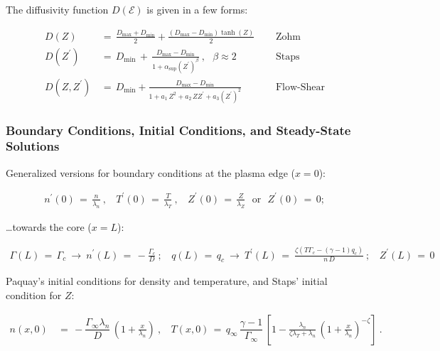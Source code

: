 \documentclass[a4paper,8pt]{article}
\begin{document}
\normalsize

The diffusivity function \(D(\mathcal{E})\) is given in a few forms:
\small

\begin{align}
    D(Z) \,&=\, \frac{D_\text{max} + D_\text{min}}{2} +
        \frac{(D_\text{max} - D_\text{min})\tanh(Z)}{2} ~~~~~~ &\text{Zohm} \\
    D(Z^\prime) \,&=\, D_\text{min} \,+\, \frac{D_\text{max} - D_\text{min}}
        {1 + \alpha_\text{sup}(Z^\prime)^\beta}~,~~~ \beta \approx 2 ~~~~~~
        &\text{Staps} \\
    D(Z, Z^\prime) \,&=\, D_\text{min} + \frac{D_\text{max} - D_\text{min}}
        {1 + a_1\,Z^2 + a_2\,Z Z^\prime + a_3\left(Z^\prime\right)^2} ~~~~~~
        &\text{Flow-Shear}
\end{align}

\normalsize

\subsubsection{Boundary Conditions, Initial Conditions, and Steady-State
Solutions}\label{boundary-conditions-initial-conditions-and-steady-state-solutions}

Generalized versions for boundary conditions at the plasma edge
(\(x=0\)): \small

\begin{align}
    n^\prime(0) \,=\, \frac{n}{\lambda_n}~,~~~~ T^\prime(0) \,=\,
        \frac{T}{\lambda_T}~,~~~~ Z^\prime(0) \,=\, \frac{Z}{\lambda_Z}~~~
        \text{or} ~~~ Z^\prime(0) \,=\, 0;
\end{align}

\normalsize

\ldots{}towards the core (\(x=L\)): \small

\begin{align}
    \Gamma(L) \,=\, \Gamma_c ~\longrightarrow~ n^\prime(L) \,=\,
        -\frac{\Gamma_c}{D}~; ~~~~
        q(L) \,=\, q_c ~\longrightarrow~ T^\prime(L) \,=\
        \frac{\zeta\left(T \Gamma_c - (\gamma - 1) q_c\right)}{n\,D}~; ~~~~
        Z^\prime(L) \,=\, 0
\end{align}

\normalsize

Paquay's initial conditions for density and temperature, and Staps'
initial condition for \(Z\): \small

\begin{align}
    n(x,0) \,&=\, -\dfrac{\Gamma_\infty \lambda_n}{D} \,
        \left(1 + \frac{x}{\lambda_n}\right)~, ~~~~ T(x,0) \,=\, q_\infty \,
        \dfrac{\gamma - 1}{\Gamma_\infty} \, \left[1
        - \frac{\lambda_n}{\zeta \lambda_T + \lambda_n} \, \left(1
        + \frac{x}{\lambda_n}\right)^{-\zeta}\right]~.
\end{align}
\end{document}
